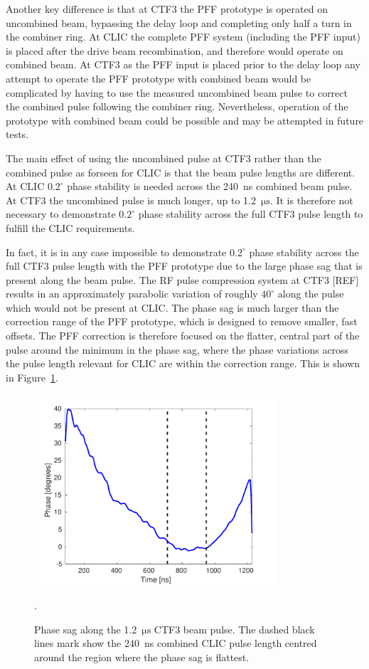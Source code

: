 Another key difference is that at CTF3 the PFF prototype is operated on uncombined beam, bypassing the delay loop and completing only half a turn in the combiner ring. At CLIC the complete PFF system (including the PFF input) is placed after the drive beam recombination, and therefore would operate on combined beam. At CTF3 as the PFF input is placed prior to the delay loop any attempt to operate the PFF prototype with combined beam would be complicated by having to use the measured uncombined beam pulse to correct the combined pulse following the combiner ring. Nevertheless, operation of the prototype with combined beam could be possible and may be attempted in future tests.

The main effect of using the uncombined pulse at CTF3 rather than the combined pulse as forseen for CLIC is that the beam pulse lengths are different. At CLIC \(0.2^\circ\) phase stability is needed across the 240~ns combined beam pulse. At CTF3 the uncombined pulse is much longer, up to 1.2~\(\mathrm{\mu s}\). It is therefore not necessary to demonstrate \(0.2^\circ\) phase stability across the full CTF3 pulse length to fulfill the CLIC requirements.

In fact, it is in any case impossible to demonstrate \(0.2^\circ\) phase stability across the full CTF3 pulse length with the PFF prototype due to the large phase sag that is present along the beam pulse. The RF pulse compression system at CTF3 [REF] results in an approximately parabolic variation of roughly \(40^\circ\) along the pulse which would not be present at CLIC. The phase sag is much larger than the correction range of the PFF prototype, which is designed to remove smaller, fast offsets. The PFF correction is therefore focused on the flatter, central part of the pulse around the minimum in the phase sag, where the phase variations across the pulse length relevant for CLIC are within the correction range. This is shown in Figure~\ref{f:ctfPhaseSag}.

\begin{figure}
  \centering
  \includegraphics[width=0.8\textwidth]{Figures/introduction/phaseSag}
  \caption{Phase sag along the 1.2~\(\mathrm{\mu s}\) CTF3 beam pulse. The dashed black lines mark show the 240~ns combined CLIC pulse length centred around the region where the phase sag is flattest.}.
  \label{f:ctfPhaseSag}
\end{figure}

